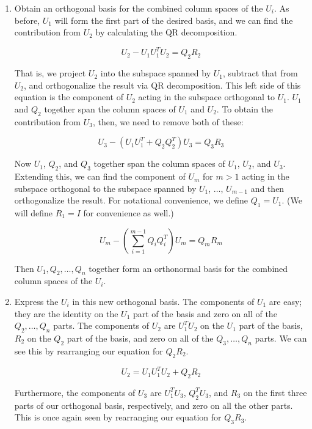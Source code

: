 \documentclass[english]{article}
\begin{document}
\begin{enumerate}

\item Obtain an orthogonal basis for the combined column spaces of the $U_i$. As before, $U_1$ will form the first part of the desired basis, and we can find the contribution from $U_2$ by calculating the QR decomposition.

$$U_2 - U_1U_1^T U_2 = Q_2 R_2$$

That is, we project $U_2$ into the subspace spanned by $U_1$, subtract that from $U_2$, and orthogonalize the result via QR decomposition. This left side of this equation is the component of $U_2$ acting in the subspace orthogonal to $U_1$. $U_1$ and $Q_2$ together span the column spaces of $U_1$ and $U_2$. To obtain the contribution from $U_3$, then, we need to remove both of these:

$$U_3 - (U_1 U_1^T + Q_2 Q_2^T) U_3 = Q_3 R_3$$

Now $U_1$, $Q_2$, and $Q_3$ together span the column spaces of $U_1$, $U_2$, and $U_3$. Extending this, we can find the component of $U_m$ for $m > 1$ acting in the subspace orthogonal to the subspace spanned by $U_1$, $\ldots$, $U_{m-1}$ and then orthogonalize the result. For notational convenience, we define $Q_1=U_1$. (We will define $R_1=I$ for convenience as well.)

\begin{equation}\label{QR multiple}U_m - \left(\sum_{i=1}^{m-1} Q_i Q_i^T\right) U_m = Q_m R_m\end{equation}

Then $U_1,Q_2,\ldots,Q_n$ together form an orthonormal basis for the combined column spaces of the $U_i$.

\item Express the $U_i$ in this new orthogonal basis. The components of $U_1$ are easy; they are the identity on the $U_1$ part of the basis and zero on all of the $Q_2,\ldots,Q_n$ parts. The components of $U_2$ are $U_1^T U_2$ on the $U_1$ part of the basis, $R_2$ on the $Q_2$ part of the basis, and zero on all of the $Q_3,\ldots,Q_n$ parts. We can see this by rearranging our equation for $Q_2 R_2$.

$$U_2 = U_1 U_1^T U_2 + Q_2 R_2$$

Furthermore, the components of $U_3$ are $U_1^T U_3$, $Q_2^T U_3$, and $R_3$ on the first three parts of our orthogonal basis, respectively, and zero on all the other parts. This is once again seen by rearranging our equation for $Q_3 R_3$.


\end{enumerate}
\end{document}
